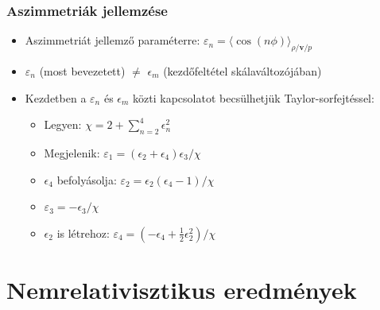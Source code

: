 \documentclass{beamer}
\begin{document}
\begin{frame}
\frametitle{Aszimmetriák jellemzése}
\begin{itemize}
  \setlength{\itemsep}{12pt}

\item<1-> Aszimmetriát jellemző paraméterre: $\varepsilon_n=\langle \cos(n\phi)\rangle_{\rho/\bm{v}/p}$
\item<2-> $\varepsilon_n$ (most bevezetett)  $\neq$ $\epsilon_m$  (kezdőfeltétel skálaváltozójában)
\item<3-> Kezdetben a $\varepsilon_n$ és $\epsilon_m$ közti kapcsolatot becsülhetjük Taylor-sorfejtéssel:
\vspace{10pt}
\begin{itemize}
 \setlength{\itemsep}{8pt}
\item<3-> Legyen: $\chi=2+\sum_{n=2}^4\epsilon_n^2$
\item<3-> Megjelenik: $\varepsilon_1=(\epsilon_2+\epsilon_4)\epsilon_3/\chi$
\item<3-> $\epsilon_4$ befolyásolja: $\varepsilon_2=\epsilon_2(\epsilon_4-1)/\chi$
\item<3-> $\varepsilon_3=-\epsilon_3/\chi$
\item<3-> $\epsilon_2$ is létrehoz: $\varepsilon_4=(-\epsilon_4+\frac{1}{2}\epsilon_2^2)/\chi$
\end{itemize}
\end{itemize}
\end{frame}

\section{Nemrelativisztikus eredmények}
\end{document}
